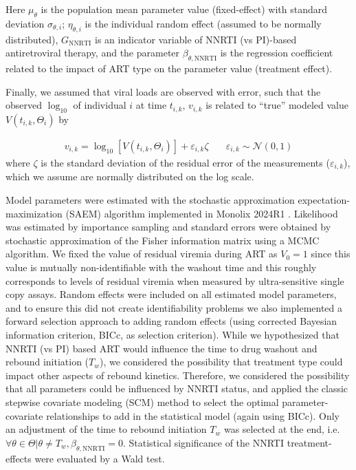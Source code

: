 \documentclass{article}[11pt]
\begin{document}
Here $\mu_{\theta}$ is the population mean parameter value (fixed-effect) with standard deviation $\sigma_{\theta,i}$; $\eta_{\theta,i}$ is the individual random effect (assumed to be normally distributed), $G_{\text{NNRTI}}$ is an indicator variable of NNRTI (vs PI)-based antiretroviral therapy, and the parameter $\beta_{\theta,\text{NNRTI}}$ is the regression coefficient related to the impact of ART type on the parameter value (treatment effect). 

Finally, we assumed that viral loads are observed with error, such that the observed $\log_{10}$ of individual $i$ at time $t_{i,k}$, $v_{i,k}$ is related to ``true'' modeled value $V(t_{i,k},\Theta_i)$  by
 
\begin{align}
    v_{i,k} = \log_{10}[V(t_{i,k},\Theta_i)] + \varepsilon_{i,k}\zeta &  \quad \varepsilon_{i,k} \sim \mathcal{N}(0,1)
\end{align}
where $\zeta$ is the standard deviation of the residual error of the measurements ($\varepsilon_{i,k}$), which we assume are normally distributed on the log scale. 

Model parameters were estimated with the stochastic approximation expectation-maximization (SAEM) algorithm implemented in Monolix 2024R1 . Likelihood was estimated by importance sampling and standard errors were obtained by stochastic approximation of the Fisher information matrix using a MCMC algorithm. We fixed the value of residual viremia during ART as $V_0 = 1$ since this value is mutually non-identifiable with the washout time and this roughly corresponds to levels of residual viremia when measured by ultra-sensitive single copy assays. Random effects were included on all estimated model parameters, and to ensure this did not create identifiability problems we also implemented a forward selection approach to adding random effects (using corrected Bayesian information criterion, BICc, as selection criterion). While we hypothesized that NNRTI (vs PI) based ART would influence the time to drug washout and rebound initiation ($T_w$), we considered the possibility that treatment type could impact other aspects of rebound kinetics. Therefore, we considered the possibility that all parameters could be influenced by NNRTI status, and applied the classic stepwise covariate modeling (SCM) method to select the optimal parameter-covariate relationships to add in the statistical model (again using BICc). Only an adjustment of the time to rebound initiation $T_w$ was selected at the end, i.e. $\forall \theta \in \Theta \vert \theta \neq T_w, \beta_{\theta, \text{NNRTI}} = 0$. Statistical significance of the NNRTI treatment-effects were evaluated by a Wald test. 
\end{document}
